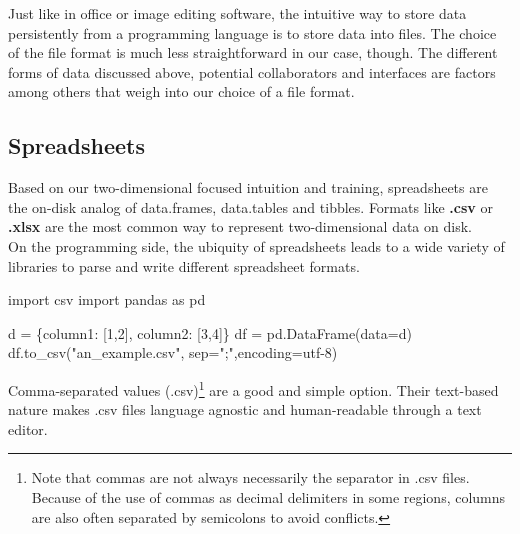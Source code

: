 \documentclass[
  12pt,
  letterpaper,
]{krantz}
\newenvironment{Shaded}{\begin{snugshade}}{\end{snugshade}}
\newcommand{\DecValTok}[1]{\textcolor[rgb]{0.68,0.00,0.00}{#1}}
\newcommand{\ImportTok}[1]{\textcolor[rgb]{0.00,0.46,0.62}{#1}}
\newcommand{\NormalTok}[1]{\textcolor[rgb]{0.00,0.23,0.31}{#1}}
\newcommand{\OperatorTok}[1]{\textcolor[rgb]{0.37,0.37,0.37}{#1}}
\newcommand{\StringTok}[1]{\textcolor[rgb]{0.13,0.47,0.30}{#1}}
\begin{document}
Just like in office or image editing software, the intuitive way to
store data persistently from a programming language is to store data
into files. The choice of the file format is much less straightforward
in our case, though. The different forms of data discussed above,
potential collaborators and interfaces are factors among others that
weigh into our choice of a file format.

\hypertarget{spreadsheets}{%
\subsection{Spreadsheets}\label{spreadsheets}}

Based on our two-dimensional focused intuition and training,
spreadsheets are the on-disk analog of data.frames, data.tables and
tibbles. Formats like \textbf{.csv} or \textbf{.xlsx} are the most
common way to represent two-dimensional data on disk.\\
On the programming side, the ubiquity of spreadsheets leads to a wide
variety of libraries to parse and write different spreadsheet formats.

\normalsize

\begin{Shaded}
\begin{Highlighting}[]
\ImportTok{import}\NormalTok{ csv}
\ImportTok{import}\NormalTok{ pandas }\ImportTok{as}\NormalTok{ pd}

\NormalTok{d }\OperatorTok{=}\NormalTok{ \{}\StringTok{\textquotesingle{}column1\textquotesingle{}}\NormalTok{: [}\DecValTok{1}\NormalTok{,}\DecValTok{2}\NormalTok{], }\StringTok{\textquotesingle{}column2\textquotesingle{}}\NormalTok{: [}\DecValTok{3}\NormalTok{,}\DecValTok{4}\NormalTok{]\}}
\NormalTok{df }\OperatorTok{=}\NormalTok{ pd.DataFrame(data}\OperatorTok{=}\NormalTok{d)}
\NormalTok{df.to\_csv(}\StringTok{"an\_example.csv"}\NormalTok{, sep}\OperatorTok{=}\StringTok{";"}\NormalTok{,encoding}\OperatorTok{=}\StringTok{\textquotesingle{}utf{-}8\textquotesingle{}}\NormalTok{)}
\end{Highlighting}
\end{Shaded}

\normalsize

Comma-separated values (.csv)\footnote{Note that commas are
  not always necessarily the separator in .csv files. Because of the use
  of commas as decimal delimiters in some regions, columns are also
  often separated by semicolons to avoid conflicts.} are a good and
simple option. Their text-based nature makes .csv files language
agnostic and human-readable through a text editor.
\end{document}
